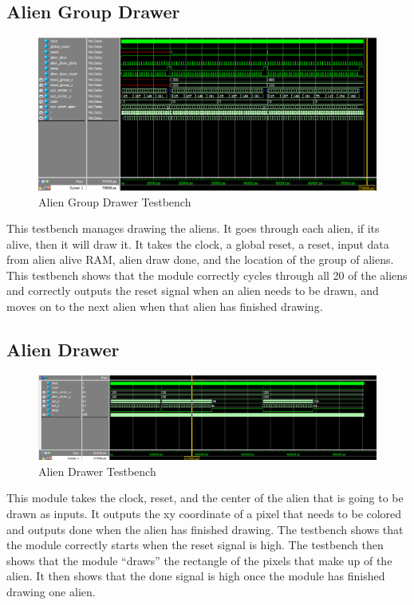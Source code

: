 \documentclass[11pt, titlepage]{article}
\begin{document}
        \subsection{Alien Group Drawer}
            \begin{figure}[H]
                \centering
                \includegraphics[scale = 0.53]{Images/Testbench Alien Group Drawer.png}
                \caption{Alien Group Drawer Testbench}
            \end{figure}
            This testbench manages drawing the aliens. It goes through each alien, if its alive, then it will draw it. It takes the clock, a global reset, a reset, input data from alien alive RAM, alien draw done, and the location of the group of aliens. This testbench shows that the module correctly cycles through all 20 of the aliens and correctly outputs the reset signal when an alien needs to be drawn, and moves on to the next alien when that alien has finished drawing.
        \subsection{Alien Drawer}
            \begin{figure}[H]
                \centering
                \includegraphics[scale = 0.49]{Images/Testbench Alien Drawer.png}
                \caption{Alien Drawer Testbench}
            \end{figure}
            This module takes the clock, reset, and the center of the alien that is going to be drawn as inputs. It outputs the xy coordinate of a pixel that needs to be colored and outputs done when the alien has finished drawing. The testbench shows that the module correctly starts when the reset signal is high. The testbench then shows that the module ``draws'' the rectangle of the pixels that make up of the alien. It then shows that the done signal is high once the module has finished drawing one alien.
\end{document}
